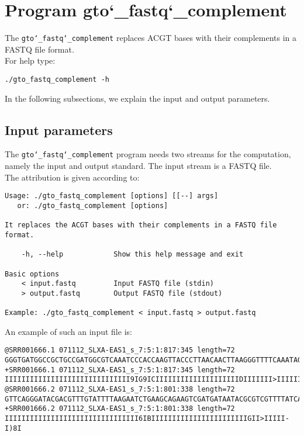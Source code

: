 \section{Program gto\char`_fastq\char`_complement}
The \texttt{gto\char`_fastq\char`_complement} replaces ACGT bases with their complements in a FASTQ file format.\\
For help type:
\begin{lstlisting}
./gto_fastq_complement -h
\end{lstlisting}
In the following subsections, we explain the input and output parameters.

\subsection*{Input parameters}

The \texttt{gto\char`_fastq\char`_complement} program needs two streams for the computation, namely the input and output standard. The input stream is a FASTQ file.\\
The attribution is given according to:
\begin{lstlisting}
Usage: ./gto_fastq_complement [options] [[--] args]
   or: ./gto_fastq_complement [options]

It replaces the ACGT bases with their complements in a FASTQ file format.

    -h, --help            Show this help message and exit

Basic options
    < input.fastq         Input FASTQ file (stdin)
    > output.fastq        Output FASTQ file (stdout)

Example: ./gto_fastq_complement < input.fastq > output.fastq
\end{lstlisting}
An example of such an input file is:
\begin{lstlisting}
@SRR001666.1 071112_SLXA-EAS1_s_7:5:1:817:345 length=72
GGGTGATGGCCGCTGCCGATGGCGTCAAATCCCACCAAGTTACCCTTAACAACTTAAGGGTTTTCAAATAGA
+SRR001666.1 071112_SLXA-EAS1_s_7:5:1:817:345 length=72
IIIIIIIIIIIIIIIIIIIIIIIIIIIIII9IG9ICIIIIIIIIIIIIIIIIIIIIDIIIIIII>IIIIII/
@SRR001666.2 071112_SLXA-EAS1_s_7:5:1:801:338 length=72
GTTCAGGGATACGACGTTTGTATTTTAAGAATCTGAAGCAGAAGTCGATGATAATACGCGTCGTTTTATCAT
+SRR001666.2 071112_SLXA-EAS1_s_7:5:1:801:338 length=72
IIIIIIIIIIIIIIIIIIIIIIIIIIIIIIII6IBIIIIIIIIIIIIIIIIIIIIIIIGII>IIIII-I)8I
\end{lstlisting}

